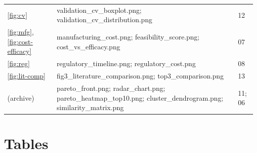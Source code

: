 \begin{table}[htbp]
\begin{tabular}{p{3.1cm}p{7.6cm}p{3.2cm}}
\ref{fig:cv} & validation\_cv\_boxplot.png; validation\_cv\_distribution.png & 12\\
\ref{fig:mfg}, \ref{fig:cost-efficacy} & manufacturing\_cost.png; feasibility\_score.png; cost\_vs\_efficacy.png & 07\\
\ref{fig:reg} & regulatory\_timeline.png; regulatory\_cost.png & 08\\
\ref{fig:lit-comp} & fig3\_literature\_comparison.png; top3\_comparison.png & 13\\
(archive) & pareto\_front.png; radar\_chart.png; pareto\_heatmap\_top10.png; cluster\_dendrogram.png; similarity\_matrix.png & 11; 06\\
\bottomrule
\end{tabular}
\end{table}

\section{Tables}
